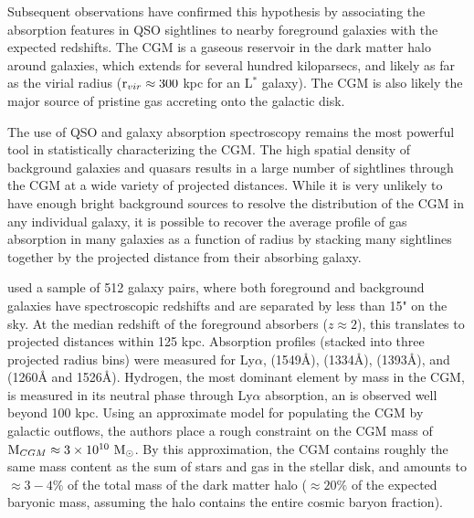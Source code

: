 Subsequent observations have confirmed this hypothesis by associating
the absorption features in QSO sightlines to nearby foreground
galaxies with the expected redshifts. The CGM is a gaseous reservoir
in the dark matter halo around galaxies, which extends for several
hundred kiloparsecs, and likely as far as the virial radius
($\textrm{r\ensuremath{_{vir}}}{}\approx 300$ kpc for an L$^*$ galaxy). The CGM is also likely
the major source of pristine gas accreting onto the galactic disk. 

The use of QSO and galaxy absorption spectroscopy remains the most
powerful tool in statistically characterizing the CGM. The high
spatial density of background galaxies and quasars results in a large
number of sightlines through the CGM at a wide variety of projected
distances. While it is very unlikely to have enough bright background
sources to resolve the distribution of the CGM in any individual
galaxy, it is possible to recover the average profile of gas
absorption in many galaxies as a function of radius by stacking many
sightlines together by the projected distance from their absorbing
galaxy.

\citet{Steidel2010} used a sample of 512 galaxy pairs, where both
foreground and background galaxies have spectroscopic redshifts and
are separated by less than 15" on the sky. At the median redshift of
the foreground absorbers ($z\approx 2$), this translates to projected
distances within 125 kpc. Absorption profiles (stacked into three
projected radius bins) were measured for Ly$\alpha$, 
(1549\AA),  (1334\AA),  (1393\AA), and
(1260\AA{} and 1526\AA). Hydrogen, the most dominant
element by mass in the CGM, is measured in its neutral phase through
Ly$\alpha$ absorption, an is observed well beyond 100 kpc. Using an
approximate model for populating the CGM by galactic outflows, the
authors place a rough constraint on the CGM mass of $\textrm{M}{}_{CGM}
\approx 3\times 10^{10} ~\textrm{M}_\odot{}$. By this approximation, the CGM contains
roughly the same mass content as the sum of stars and gas in the
stellar disk, and amounts to $\approx 3-4\%$ of the total mass of the
dark matter halo ($\approx 20\%$ of the expected baryonic mass,
assuming the halo contains the entire cosmic baryon fraction).

